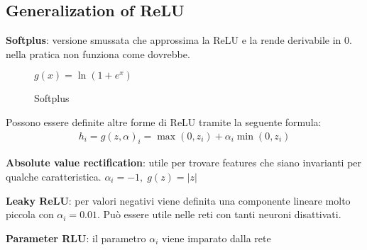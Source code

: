\subsection*{Generalization of ReLU}

\textbf{Softplus}: versione smussata che approssima la ReLU e la rende derivabile in 0.
nella pratica non funziona come dovrebbe.

\begin{figure}[ht]
  \centering

  $g(x) = \ln(1 + e^x)$
  \caption{Softplus}
\end{figure}

Possono essere definite altre forme di ReLU tramite la seguente formula:
\begin{align*}
  h_i = g(z, \alpha)_i = \max(0, z_i) + \alpha_i \min(0, z_i)
\end{align*}

\textbf{Absolute value rectification}: utile per trovare features che siano invarianti per qualche caratteristica. $\alpha_i = -1,\; g(z) = |z|$

\textbf{Leaky ReLU}: per valori negativi viene definita una componente lineare molto piccola con $\alpha_i = 0.01$. Può essere utile nelle reti con tanti neuroni disattivati.

\textbf{Parameter RLU}: il parametro $\alpha_i$ viene imparato dalla rete

